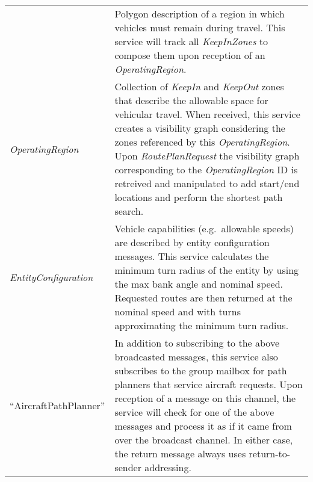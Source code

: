 \begin{longtable}[c]{@{}ll@{}}
\begin{minipage}[t]{0.29\columnwidth}
\strut\end{minipage} &
\begin{minipage}[t]{0.65\columnwidth}\raggedright\strut
Polygon description of a region in which vehicles must remain during
travel. This service will track all \emph{KeepInZones} to compose them
upon reception of an \emph{OperatingRegion}.
\strut\end{minipage}\tabularnewline
\begin{minipage}[t]{0.29\columnwidth}\raggedright\strut
\emph{OperatingRegion}
\strut\end{minipage} &
\begin{minipage}[t]{0.65\columnwidth}\raggedright\strut
Collection of \emph{KeepIn} and \emph{KeepOut} zones that describe the
allowable space for vehicular travel. When received, this service
creates a visibility graph considering the zones referenced by this
\emph{OperatingRegion}. Upon \emph{RoutePlanRequest} the visibility
graph corresponding to the \emph{OperatingRegion} ID is retreived and
manipulated to add start/end locations and perform the shortest path
search.
\strut\end{minipage}\tabularnewline
\begin{minipage}[t]{0.29\columnwidth}\raggedright\strut
\emph{EntityConfiguration}
\strut\end{minipage} &
\begin{minipage}[t]{0.65\columnwidth}\raggedright\strut
Vehicle capabilities (e.g.~allowable speeds) are described by entity
configuration messages. This service calculates the minimum turn radius
of the entity by using the max bank angle and nominal speed. Requested
routes are then returned at the nominal speed and with turns
approximating the minimum turn radius.
\strut\end{minipage}\tabularnewline
\begin{minipage}[t]{0.29\columnwidth}\raggedright\strut
``AircraftPathPlanner''
\strut\end{minipage} &
\begin{minipage}[t]{0.65\columnwidth}\raggedright\strut
In addition to subscribing to the above broadcasted messages, this
service also subscribes to the group mailbox for path planners that
service aircraft requests. Upon reception of a message on this channel,
the service will check for one of the above messages and process it as
if it came from over the broadcast channel. In either case, the return
message always uses return-to-sender addressing.
\strut\end{minipage}\tabularnewline
\bottomrule
\end{longtable}


